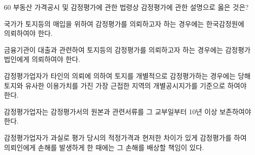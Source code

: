 \begin{question}{60}
부동산 가격공시 및 감정평가에 관한 법령상 감정평가에 관한 설명으로 옳은 것은?
\begin{choices}
  \item 국가가 토지등의 매입을 위하여 감정평가를 의뢰하고자 하는 경우에는 한국감정원에 의뢰하여야 한다.
  \item 금융기관이 대출과 관련하여 토지등의 감정평가를 의뢰하고자 하는 경우에는 감정평가법인에게 의뢰하여야 한다.
  \item 감정평가업자가 타인의 의뢰에 의하여 토지를 개별적으로 감정평가하는 경우에는 당해 토지와 유사한 이용가치를 가진 가장 근접한 지역의 개별공시지가를 기준으로 하여야 한다.
  \item 감정평가업자는 감정평가서의 원본과 관련서류를 그 교부일부터 10년 이상 보존하여야 한다.
  \item 감정평가업자가 과실로 평가 당시의 적정가격과 현저한 차이가 있게 감정평가를 하여 의뢰인에게 손해를 발생하게 한 때에는 그 손해를 배상할 책임이 있다.
\end{choices}
\end{question}

